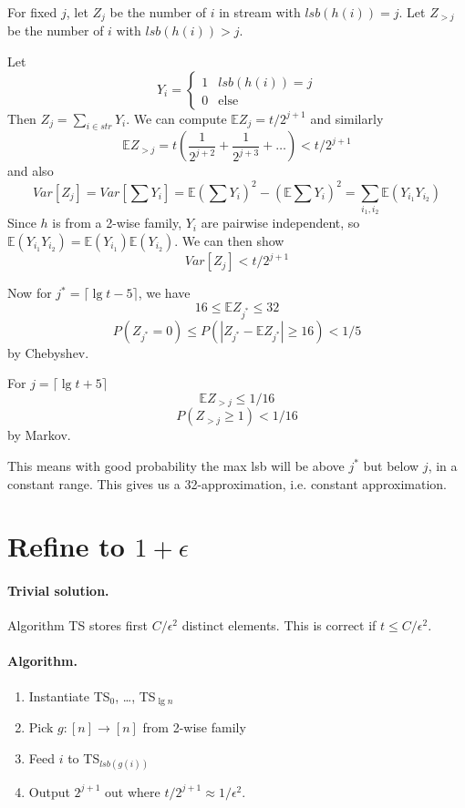 \documentclass[11pt]{article}
\begin{document}
For fixed $j$, let $Z_j$ be the number of $i$ in stream with $lsb(h(i)) = j$. Let $Z_{>j}$ be the number of $i$ with $lsb(h(i)) > j$.

Let
$$Y_i = \begin{cases} 1 & lsb(h(i)) = j \\ 0 & \text{else} \end{cases}$$
Then $Z_j = \sum_{i \in str} Y_i$. We can compute $\mathbb E Z_j = t/2^{j+1}$ and similarly
$$\mathbb E Z_{>j} = t(\frac1{2^{j+2}} + \frac1{2^{j+3}} + \ldots) < t/2^{j+1}$$
and also
$$Var[Z_j] = Var[\sum Y_i] = \mathbb E(\sum Y_i)^2 - (\mathbb E \sum Y_i)^2 = \sum_{i_1,i_2} \mathbb E(Y_{i_1}Y_{i_2})$$
Since $h$ is from a 2-wise family, $Y_i$ are pairwise independent, so $\mathbb E(Y_{i_1}Y_{i_2}) = \mathbb E(Y_{i_1}) \mathbb E(Y_{i_2})$. We can then show
$$Var[Z_j] < t/2^{j+1}$$

Now for $j^* = \lceil \lg t - 5 \rceil$, we have
$$16 \leq \mathbb EZ_{j^*} \leq 32$$
$$P(Z_{j^*} = 0) \leq P(|Z_{j^*} - \mathbb EZ_{j^*}| \geq 16) < 1/5$$
by Chebyshev.

For $j = \lceil \lg t + 5 \rceil$
$$\mathbb E Z_{> j} \leq 1/16$$
$$P(Z_{>j} \geq 1) < 1/16$$
by Markov.

This means with good probability the max lsb will be above $j^*$ but below $j$, in a constant range. This gives us a 32-approximation, i.e. constant approximation.

\section{Refine to $1 + \epsilon$}

\paragraph{Trivial solution.} Algorithm TS stores first $C/\epsilon^2$ distinct elements. This is correct if $t \leq C/\epsilon^2$.

\paragraph{Algorithm.}

\begin{enumerate}
\item Instantiate TS$_0$, \ldots, TS$_{\lg n}$
\item Pick $g : [n] \to [n]$ from 2-wise family
\item Feed $i$ to TS$_{lsb(g(i))}$
\item Output $2^{j+1}$ out where $t/2^{j+1} \approx 1/\epsilon^2$.
\end{enumerate}
\end{document}
